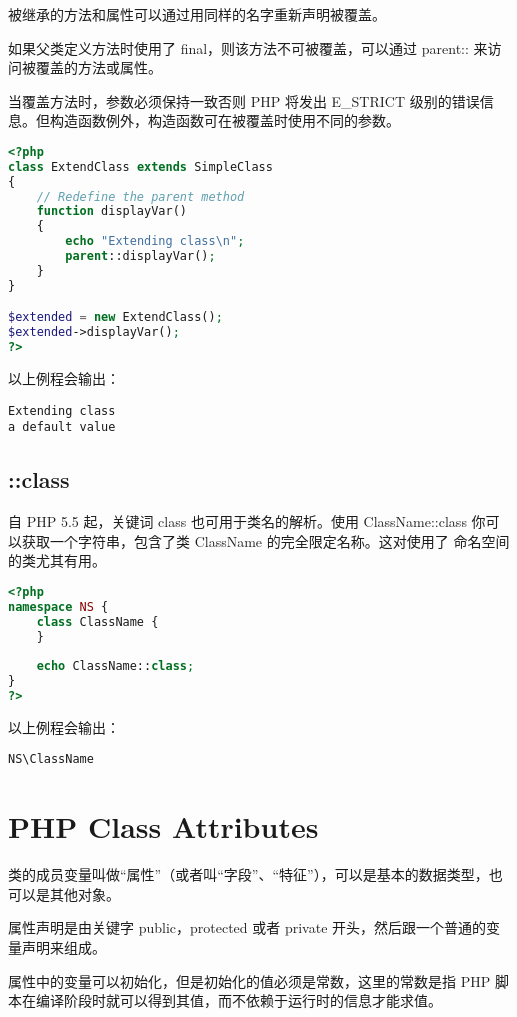 被继承的方法和属性可以通过用同样的名字重新声明被覆盖。

如果父类定义方法时使用了 final，则该方法不可被覆盖，可以通过 parent:: 来访问被覆盖的方法或属性。

当覆盖方法时，参数必须保持一致否则 PHP 将发出 E\_STRICT 级别的错误信息。但构造函数例外，构造函数可在被覆盖时使用不同的参数。


\begin{lstlisting}[language=PHP]
<?php
class ExtendClass extends SimpleClass
{
    // Redefine the parent method
    function displayVar()
    {
        echo "Extending class\n";
        parent::displayVar();
    }
}

$extended = new ExtendClass();
$extended->displayVar();
?>
\end{lstlisting}

以上例程会输出：

\begin{verbatim}
Extending class
a default value
\end{verbatim}


\section{::class}

自 PHP 5.5 起，关键词 class 也可用于类名的解析。使用 ClassName::class 你可以获取一个字符串，包含了类 ClassName 的完全限定名称。这对使用了 命名空间 的类尤其有用。


\begin{lstlisting}[language=PHP]
<?php
namespace NS {
    class ClassName {
    }
    
    echo ClassName::class;
}
?>
\end{lstlisting}

以上例程会输出：

\begin{verbatim}
NS\ClassName
\end{verbatim}

\chapter{PHP Class Attributes}

类的成员变量叫做“属性”（或者叫“字段”、“特征”），可以是基本的数据类型，也可以是其他对象。

属性声明是由关键字 public，protected 或者 private 开头，然后跟一个普通的变量声明来组成。

属性中的变量可以初始化，但是初始化的值必须是常数，这里的常数是指 PHP 脚本在编译阶段时就可以得到其值，而不依赖于运行时的信息才能求值。

